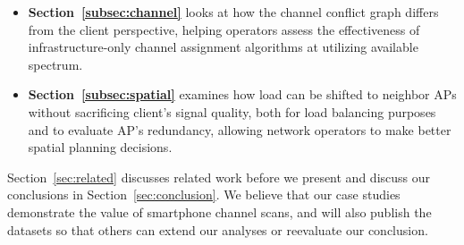 \begin{itemize}
  \item \textbf{Section~\ref{subsec:channel}} looks at how the channel conflict
    graph differs from the client perspective, helping operators assess the
    effectiveness of infrastructure-only channel assignment algorithms at
    utilizing available spectrum.

  \item \textbf{Section~\ref{subsec:spatial}} examines how load can be
    shifted to neighbor APs without sacrificing client's signal quality, both for
    load balancing purposes and to evaluate AP's redundancy, allowing network
    operators to make better spatial planning decisions.
\end{itemize}

Section~\ref{sec:related} discusses related work before we present and
discuss our conclusions in Section~\ref{sec:conclusion}. We believe that our
case studies demonstrate the value of smartphone channel scans, and will
also publish the datasets so that others can extend our analyses or reevaluate
our conclusion.
